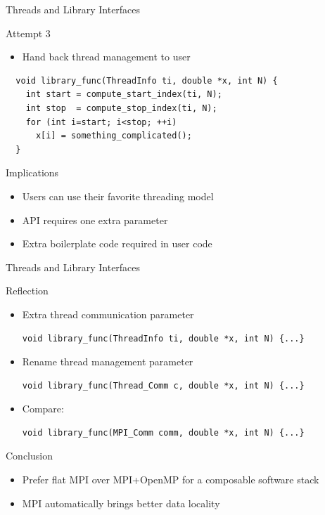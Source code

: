 \begin{frame}[fragile]{Threads and Library Interfaces}

 \begin{block}{Attempt 3}
  \begin{itemize}
   \item Hand back thread management to user
  \end{itemize}
 \end{block}

  \begin{lstlisting}
  void library_func(ThreadInfo ti, double *x, int N) {
    int start = compute_start_index(ti, N);
    int stop  = compute_stop_index(ti, N);
    for (int i=start; i<stop; ++i)
      x[i] = something_complicated();
  }
  \end{lstlisting}

  \begin{block}{Implications}
   \begin{itemize}
    \item Users can use their favorite threading model
    \item API requires one extra parameter
    \item Extra boilerplate code required in user code
  \end{itemize}
 \end{block}
\end{frame}


\begin{frame}[fragile]{Threads and Library Interfaces}

 \begin{block}{Reflection}
  \begin{itemize}
   \item Extra thread communication parameter
    \begin{lstlisting}
void library_func(ThreadInfo ti, double *x, int N) {...}
    \end{lstlisting}
   \item Rename thread management parameter
    \begin{lstlisting}
void library_func(Thread_Comm c, double *x, int N) {...}
    \end{lstlisting}
   \item Compare:
    \begin{lstlisting}
void library_func(MPI_Comm comm, double *x, int N) {...}
    \end{lstlisting}
  \end{itemize}
 \end{block}

  \begin{block}{Conclusion}
   \begin{itemize}
    \item Prefer flat MPI over MPI+OpenMP for a composable software stack
    \item MPI automatically brings better data locality
  \end{itemize}
 \end{block}

\end{frame}
